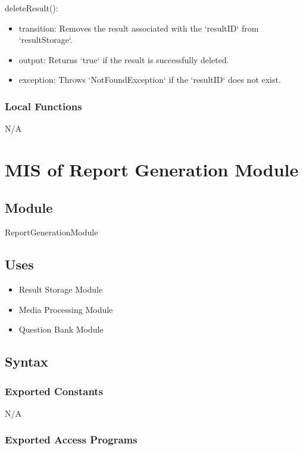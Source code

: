 \documentclass[12pt, titlepage]{article}
\begin{document}
\noindent deleteResult():
\begin{itemize}
\item transition: Removes the result associated with the `resultID` from `resultStorage`.
\item output: Returns `true` if the result is successfully deleted.
\item exception: Throws `NotFoundException` if the `resultID` does not exist.
\end{itemize}

\subsubsection{Local Functions}

N/A

\section{MIS of Report Generation Module} \label{ReportGenerationModule}

\subsection{Module}

ReportGenerationModule

\subsection{Uses}

\begin{itemize}
\item Result Storage Module
\item Media Processing Module
\item Question Bank Module
\end{itemize}

\subsection{Syntax}

\subsubsection{Exported Constants}

N/A

\subsubsection{Exported Access Programs}
\end{document}
